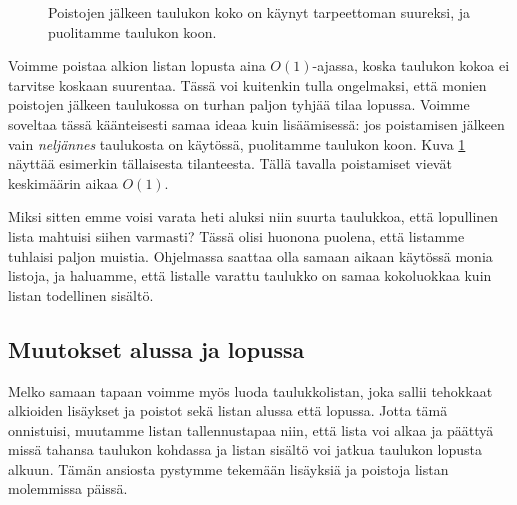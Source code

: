 \begin{figure}
\center
{}
\caption{Poistojen jälkeen taulukon koko on käynyt tarpeettoman suureksi,
ja puolitamme taulukon koon.}                                                                        
\label{fig:lispoi}
\end{figure}

Voimme poistaa alkion listan lopusta aina $O(1)$-ajassa,
koska taulukon kokoa ei tarvitse koskaan suurentaa.
Tässä voi kuitenkin tulla ongelmaksi, että monien poistojen
jälkeen taulukossa on turhan paljon tyhjää tilaa lopussa.
Voimme soveltaa tässä käänteisesti samaa ideaa kuin lisäämisessä:
jos poistamisen jälkeen vain \emph{neljännes} taulukosta on käytössä,
puolitamme taulukon koon.
Kuva \ref{fig:lispoi} näyttää esimerkin tällaisesta tilanteesta.
Tällä tavalla poistamiset vievät keskimäärin aikaa $O(1)$.

Miksi sitten emme voisi varata heti aluksi niin suurta taulukkoa,
että lopullinen lista mahtuisi siihen varmasti?
Tässä olisi huonona puolena, että listamme tuhlaisi paljon muistia.
Ohjelmassa saattaa olla samaan aikaan käytössä monia listoja,
ja haluamme, että listalle varattu taulukko on samaa kokoluokkaa
kuin listan todellinen sisältö.

\subsection{Muutokset alussa ja lopussa}

Melko samaan tapaan voimme myös luoda taulukkolistan,
joka sallii tehokkaat alkioiden lisäykset ja poistot
sekä listan alussa että lopussa.
Jotta tämä onnistuisi, muutamme listan tallennustapaa niin,
että lista voi alkaa ja päättyä missä tahansa taulukon
kohdassa ja listan sisältö voi jatkua taulukon lopusta alkuun.
Tämän ansiosta pystymme tekemään lisäyksiä ja poistoja
listan molemmissa päissä.

